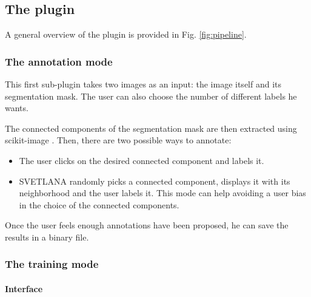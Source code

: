 \documentclass{article}
\begin{document}
\subsection{The plugin}

A general overview of the plugin is provided in Fig. \ref{fig:pipeline}. 

\subsubsection{The annotation mode}


This first sub-plugin takes two images as an input: the image itself and its segmentation mask. The user can also choose the number of different labels he wants.

The connected components of the segmentation mask are then extracted using scikit-image \cite{van2014scikit}. 
Then, there are two possible ways to annotate: 
\begin{itemize}
  \setlength{\itemsep}{3pt}%
  \setlength{\parskip}{0pt}%
  \item The user clicks on the desired connected component and labels it. 
  \item SVETLANA randomly picks a connected component, displays it with its neighborhood and the user labels it. This mode can help avoiding a user bias in the choice of the connected components.
\end{itemize}

Once the user feels enough annotations have been proposed, he can save the results in a binary file.

\subsubsection{The training mode}

\paragraph*{Interface}
\end{document}
